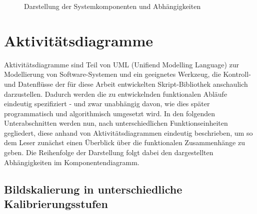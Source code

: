 \documentclass[
fontsize=10pt, 
listof = totoc,
parskip = half	
]{report}
\begin{document}
\begin{figure}[H]
	\centering
	\caption{Darstellung der Systemkomponenten und Abhängigkeiten}
	\label{fig:Komponentendiagramm}
\end{figure}



\section{Aktivitätsdiagramme}

\label{sec:Workflows}
Aktivitätsdiagramme sind Teil von UML (Unifiend Modelling Language) zur Modellierung von Software-Systemen und ein geeignetes Werkzeug, die Kontroll- und Datenflüsse der für diese Arbeit entwickelten Skript-Bibliothek anschaulich darzustellen. Dadurch werden die zu entwickelnden funktionalen Abläufe eindeutig spezifiziert - und zwar unabhängig davon, wie dies später programmatisch und algorithmisch umgesetzt wird. In den folgenden Unterabschnitten werden nun, nach unterschiedlichen Funktionseinheiten gegliedert, diese anhand von Aktivitätsdiagrammen eindeutig beschrieben, um so dem Leser zunächst einen Überblick über die funktionalen Zusammenhänge zu geben. Die Reihenfolge der Darstellung folgt dabei den dargestellten Abhängigkeiten im Komponentendiagramm.

\subsection{Bildskalierung in unterschiedliche Kalibrierungsstufen}
\end{document}
